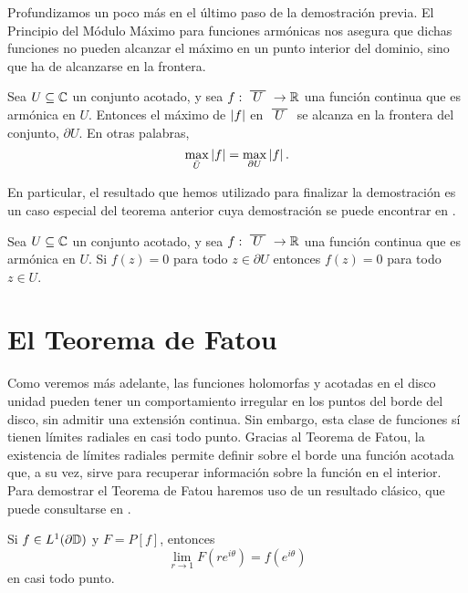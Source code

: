 Profundizamos un poco más en el último paso de la demostración previa. El Principio del Módulo Máximo para funciones armónicas nos asegura que dichas funciones no pueden alcanzar el máximo en un punto interior del dominio, sino que ha de alcanzarse en la frontera. \\

\begin{theorem}
    Sea $U \subseteq \mathbb{C}$ un conjunto acotado, y sea $f: \xbar{U} \to \real$ una función continua que es armónica en $U$. Entonces el máximo de $\left\lvert f\right\rvert$ en $\xbar{U}$ se alcanza en la frontera del conjunto, $\partial U$. En otras palabras,
    \begin{equation*}
        \max_{\bar{U}} \left\lvert f\right\rvert = \max_{\partial U}\left\lvert f\right\rvert.
    \end{equation*}
\end{theorem}

En particular, el resultado que hemos utilizado para finalizar la demostración es un caso especial del teorema anterior cuya demostración se puede encontrar en \citet[capítulo 10]{conway1}. \\

\begin{corollary}
    Sea $U \subseteq \mathbb{C}$ un conjunto acotado, y sea $f: \xbar{U} \to \real$ una función continua que es armónica en $U$. Si $f(z) = 0$ para todo $z \in \partial U$ entonces $f(z) = 0$ para todo $z \in U$.
\end{corollary}


\section{El Teorema de Fatou}

Como veremos más adelante, las funciones holomorfas y acotadas en el disco unidad pueden tener un comportamiento irregular en los puntos del borde del disco, sin admitir una extensión continua. Sin embargo, esta clase de funciones sí tienen límites radiales en casi todo punto. Gracias al Teorema de Fatou, la existencia de límites radiales permite definir sobre el borde una función acotada que, a su vez, sirve para recuperar información sobre la función en el interior. \\

Para demostrar el Teorema de Fatou haremos uso de un resultado clásico, que puede consultarse en \citet[capítulo 11]{rudin}. \\

\begin{theorem} %
    \label{th:fatouaux1}
    Si $f \in L^1(\partial \mathbb{D})$ y $F = P[f]$, entonces
    \begin{equation*}
        \lim_{r \to 1} F(re^{i \theta}) = f(e^{i \theta})
    \end{equation*}
    en casi todo punto. \\
\end{theorem}

